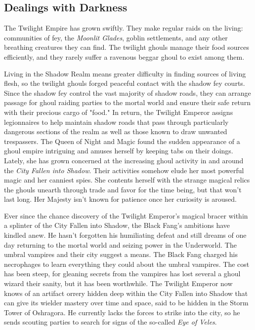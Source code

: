 \documentclass[10pt,a4paper,twoside,bg=print,twocolumn,openany,nodeprecatedcode]{dndbook}
\begin{document}
\subsection{Dealings with Darkness}
The Twilight Empire has grown swiftly. They make regular raids on the living: communities of fey, the \textit{Moonlit Glades}, goblin settlements, and any other breathing creatures they can find. The twilight ghouls manage their food sources efficiently, and they rarely suffer a ravenous beggar ghoul to exist among them.

Living in the Shadow Realm means greater difficulty in finding sources of living flesh, so the twilight ghouls forged peaceful contact with the shadow fey courts. Since the shadow fey control the vast majority of shadow roads, they can arrange passage for ghoul raiding parties to the mortal world and ensure their safe return with their precious cargo of "food." In return, the Twilight Emperor assigns legionnaires to help maintain shadow roads that pass through particularly dangerous sections of the realm as well as those known to draw unwanted trespassers. The Queen of Night and Magic found the sudden appearance of a ghoul empire intriguing and amuses herself by keeping tabs on their doings. Lately, she has grown concerned at the increasing ghoul activity in and around the \textit{City Fallen into Shadow}. Their activities somehow elude her most powerful magic and her canniest spies. She contents herself with the strange magical relics the ghouls unearth through trade and favor for the time being, but that won't last long. Her Majesty isn't known for patience once her curiosity is aroused.

Ever since the chance discovery of the Twilight Emperor's magical bracer within a splinter of the City Fallen into Shadow, the Black Fang's ambitions have kindled anew. He hasn't forgotten his humiliating defeat and still dreams of one day returning to the mortal world and seizing power in the Underworld. The umbral vampires and their city suggest a means. The Black Fang charged his necrophages to learn everything they could about the umbral vampires. The cost has been steep, for gleaning secrets from the vampires has lost several a ghoul wizard their sanity, but it has been worthwhile. The Twilight Emperor now knows of an artifact orrery hidden deep within the City Fallen into Shadow that can give its wielder mastery over time and space, said to be hidden in the Storm Tower of Oshragora. He currently lacks the forces to strike into the city, so he sends scouting parties to search for signs of the so-called \textit{Eye of Veles}.
\end{document}
